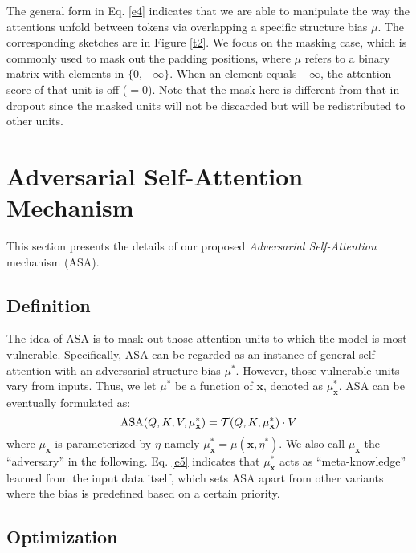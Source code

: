 \documentclass[letterpaper]{article} \usepackage{aaai23}  \usepackage{times}  \usepackage{helvet}  \usepackage{courier}  \usepackage[hyphens]{url}  \usepackage{graphicx} \urlstyle{rm} \def\UrlFont{\rm}  \usepackage{natbib}  \usepackage{caption} \frenchspacing  \setlength{\pdfpagewidth}{8.5in}  \setlength{\pdfpageheight}{11in}  \usepackage{algorithm}
\begin{document}
The general form in Eq. \ref{e4} indicates that we are able to manipulate the way the attentions unfold between tokens via overlapping a specific structure bias $ \mu $. The corresponding sketches are in Figure \ref{t2}. We focus on the masking case, which is commonly used to mask out the padding positions, where $ \mu $ refers to a binary matrix with elements in $ \{0, -\infty\} $. When an element equals $ -\infty $, the attention score of that unit is off ($ =0 $). Note that the mask here is different from that in dropout \citep{DBLP:journals/jmlr/SrivastavaHKSS14} since the masked units will not be discarded but will be redistributed to other units.


\section{Adversarial Self-Attention Mechanism}
\label{s3}

This section presents the details of our proposed \textit{Adversarial Self-Attention} mechanism (ASA).

\subsection{Definition}
\label{asa}

The idea of ASA is to mask out those attention units to which the model is most vulnerable. Specifically, ASA can be regarded as an instance of general self-attention with an adversarial structure bias $ \mu^* $. However, those vulnerable units vary from inputs. Thus, we let $ \mu^* $ be a function of $ \mathbf x $, denoted as $ \mu_{\mathbf x}^* $. ASA can be eventually formulated as:  
\begin{equation}
{\rm ASA}(Q,K,V,\mu_{\mathbf x}^*)=\mathcal T(Q,K,\mu_{\mathbf x}^*) \cdot V
\label{e5}
\end{equation}
where $ \mu_{\mathbf x} $ is parameterized by $ \eta $ namely $ \mu_{\mathbf x}^*=\mu(\mathbf x,\eta^*) $. We also call $ \mu_{\mathbf x} $ the ``adversary'' in the following. Eq. \ref{e5} indicates that $ \mu_{\mathbf x}^* $ acts as ``meta-knowledge'' learned from the input data itself, which sets ASA apart from other variants where the bias is predefined based on a certain priority.

\subsection{Optimization}
\end{document}
